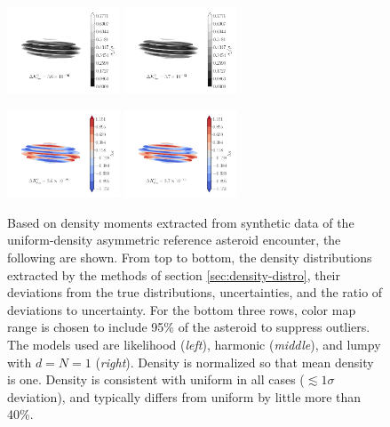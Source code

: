 \documentclass[fleqn,usenatbib]{mnras}
\begin{document}
\begin{figure}
  \includegraphics[width=0.3\textwidth]{figs/asym-ell-unc-likelihood.pdf}\hfill
  \includegraphics[width=0.3\textwidth]{figs/asym-ell-unc-harmonic.pdf}\hfill\hspace{0.3\textwidth}

  \includegraphics[width=0.3\textwidth]{figs/asym-ell-rat-likelihood.pdf}\hfill
  \includegraphics[width=0.3\textwidth]{figs/asym-ell-rat-harmonic.pdf}\hfill\hspace{0.3\textwidth}

  \caption{Based on density moments extracted from synthetic data of the uniform-density asymmetric reference asteroid encounter, the following are shown. From top to bottom, the density distributions extracted by the methods of section \ref{sec:density-distro}, their deviations from the true distributions, uncertainties, and the ratio of deviations to uncertainty. For the bottom three rows, color map range is chosen to include 95\% of the asteroid to suppress outliers. The models used are likelihood (\textit{left}), harmonic (\textit{middle}), and lumpy with $d=N=1$ (\textit{right}). Density is normalized so that mean density is one. Density is consistent with uniform in all cases ($\lesssim 1 \sigma$ deviation), and typically differs from uniform by little more than 40\%.}
  \label{fig:uniform-density-results}
\end{figure}
\end{document}
